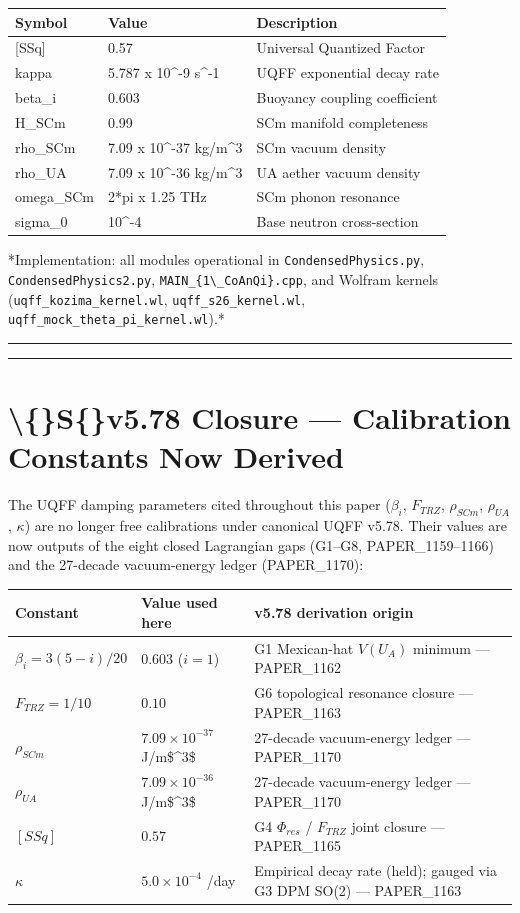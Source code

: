 \documentclass[11pt]{article}
\begin{document}
\begin{center}
\begin{longtable}{lll}
\toprule
Symbol & Value & Description \tabularnewline
\midrule
\endhead
{}[SSq] & 0.57 & Universal Quantized Factor \tabularnewline
kappa & 5.787 x 10\textasciicircum{}-9 s\textasciicircum{}-1 & UQFF exponential decay rate \tabularnewline
beta\_i & 0.603 & Buoyancy coupling coefficient \tabularnewline
H\_SCm & 0.99 & SCm manifold completeness \tabularnewline
rho\_SCm & 7.09 x 10\textasciicircum{}-37 kg/m\textasciicircum{}3 & SCm vacuum density \tabularnewline
rho\_UA & 7.09 x 10\textasciicircum{}-36 kg/m\textasciicircum{}3 & UA aether vacuum density \tabularnewline
omega\_SCm & 2*pi x 1.25 THz & SCm phonon resonance \tabularnewline
sigma\_0 & 10\textasciicircum{}-4 & Base neutron cross-section \tabularnewline
\bottomrule
\end{longtable}
\end{center}

*Implementation: all modules operational in \verb|CondensedPhysics.py|, \verb|CondensedPhysics2.py|, \verb|MAIN_{1\_CoAnQi}.cpp|, and Wolfram kernels (\verb|uqff_kozima_kernel.wl|, \verb|uqff_s26_kernel.wl|, \verb|uqff_mock_theta_pi_kernel.wl|).*

\noindent\rule{\textwidth}{0.4pt}

\noindent\rule{\textwidth}{0.4pt}

\section*{\textbackslash\{\}S\{\}v5.78 Closure --- Calibration Constants Now Derived}

The UQFF damping parameters cited throughout this paper ($\beta_i$, $F_{TRZ}$, $\rho_{SCm}$, $\rho_{UA}$, $\kappa$) are no longer free calibrations under canonical UQFF v5.78. Their values are now outputs of the eight closed Lagrangian gaps (G1--G8, PAPER\_1159--1166) and the 27-decade vacuum-energy ledger (PAPER\_1170):

\begin{center}
\begin{longtable}{lll}
\toprule
Constant & Value used here & v5.78 derivation origin \tabularnewline
\midrule
\endhead
$\beta_i = 3(5-i)/20$ & $0.603$ ($i=1$) & G1 Mexican-hat $V(U_A)$ minimum --- PAPER\_1162 \tabularnewline
$F_{TRZ} = 1/10$ & $0.10$ & G6 topological resonance closure --- PAPER\_1163 \tabularnewline
$\rho_{SCm}$ & $7.09\times10^{-37}$ J/m\$\textasciicircum{}3\$ & 27-decade vacuum-energy ledger --- PAPER\_1170 \tabularnewline
$\rho_{UA}$ & $7.09\times10^{-36}$ J/m\$\textasciicircum{}3\$ & 27-decade vacuum-energy ledger --- PAPER\_1170 \tabularnewline
$[SSq]$ & $0.57$ & G4 $\Phi_{res}$ / $F_{TRZ}$ joint closure --- PAPER\_1165 \tabularnewline
$\kappa$ & $5.0\times10^{-4}$ /day & Empirical decay rate (held); gauged via G3 DPM SO(2) --- PAPER\_1163 \tabularnewline
\bottomrule
\end{longtable}
\end{center}
\end{document}

